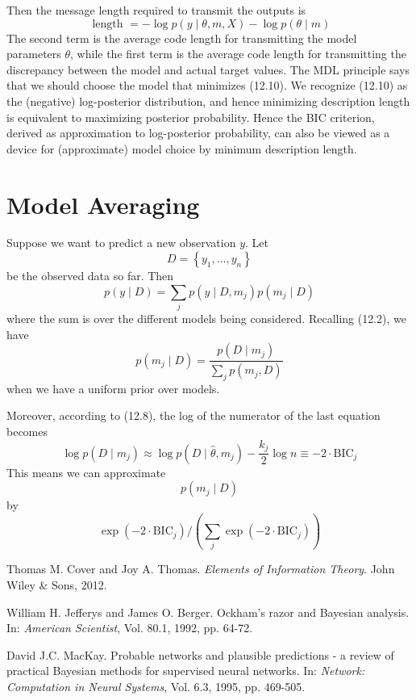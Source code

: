 \documentclass[11pt]{article}
\theoremstyle{plain} %
\theoremstyle{remark}
\begin{document}
Then the message length required to transmit the outputs is
$$
\text { length }=-\log p(y \mid \theta, m, X)-\log p(\theta \mid m)
$$
The second term is the average code length for transmitting the model
  parameters $\theta$, while the first term is the average code length for
  transmitting the discrepancy between the model and actual target values. The MDL principle says that we should choose the model that minimizes
  (12.10). We recognize (12.10) as the (negative) log-posterior distribution, and
  hence minimizing description length is equivalent to maximizing posterior
  probability. Hence the BIC criterion, derived as approximation to log-posterior
  probability, can also be viewed as a device for (approximate) model choice by
  minimum description length.

\section{Model Averaging}
Suppose we want to predict a new observation $y$. Let
$$
D=\left\{y_{1}, \ldots, y_{n}\right\}
$$
be the observed data so far. Then
$$
p(y \mid D)=\sum_{j} p\left(y \mid D, m_{j}\right) p\left(m_{j} \mid D\right)
$$
where the sum is over the different models being considered. Recalling (12.2), we have
$$
p\left(m_{j} \mid D\right)=\frac{p\left(D \mid m_{j}\right)}{\sum_{j} p\left(m_{j}, D\right)}
$$
when we have a uniform prior over models.

Moreover, according to (12.8), the log of the numerator of the last
  equation becomes
$$
\log p\left(D \mid m_{j}\right) \approx \log p\left(D \mid \hat{\theta}, m_{j}\right)-\frac{k_{j}}{2} \log n \equiv-2 \cdot \mathrm{BIC}_{j}
$$
This means we can approximate
$$
p\left(m_{j} \mid D\right)
$$
by
$$
\exp \left(-2 \cdot \mathrm{BIC}_{j}\right) /\left(\sum_{j} \exp \left(-2 \cdot \mathrm{BIC}_{j}\right)\right)
$$

\begin{thebibliography}{99}

  Thomas M. Cover and Joy A. Thomas.
  \newblock \emph{Elements of Information Theory}.
  \newblock John Wiley \& Sons, 2012.
  
  William H. Jefferys and James O. Berger.
  \newblock Ockham's razor and Bayesian analysis.
  \newblock In: \emph{American Scientist}, Vol. 80.1, 1992, pp. 64-72.
  
  David J.C. MacKay.
  \newblock Probable networks and plausible predictions - a review of practical Bayesian methods for supervised neural networks.
  \newblock In: \emph{Network: Computation in Neural Systems}, Vol. 6.3, 1995, pp. 469-505.
  
  \end{thebibliography}
  
  
\end{document}
